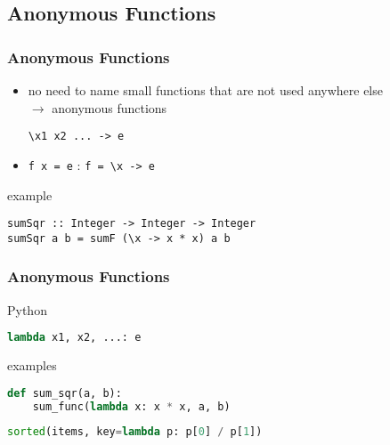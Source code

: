 \documentclass[dvipsnames]{beamer}
\theoremstyle{plain}
\begin{document}
\subsection{Anonymous Functions}

\begin{frame}[fragile]
  \frametitle{Anonymous Functions}

  \begin{itemize}
    \item no need to name small functions that are not used anywhere else\\
      $\rightarrow$ \alert{anonymous} functions
    \begin{lstlisting}[style=syntax]
\x1 x2 ... -> e
    \end{lstlisting}
    \item \lstinline|f x = e| \hspace{36pt} : \hspace{36pt} \lstinline|f = \x -> e|
  \end{itemize}

  \pause
  \medskip
  \begin{exampleblock}{example}
    \begin{lstlisting}
sumSqr :: Integer -> Integer -> Integer
sumSqr a b = sumF (\x -> x * x) a b
    \end{lstlisting}
  \end{exampleblock}
\end{frame}

\begin{frame}[fragile]
  \frametitle{Anonymous Functions}

  \begin{block}{Python}
    \begin{lstlisting}[language=Python, style=syntax]
lambda x1, x2, ...: e
    \end{lstlisting}
  \end{block}

  \medskip
  \begin{exampleblock}{examples}
    \begin{lstlisting}[language=Python]
def sum_sqr(a, b):
    sum_func(lambda x: x * x, a, b)
    \end{lstlisting}

    \pause
    \bigskip
    \begin{lstlisting}[language=Python]
sorted(items, key=lambda p: p[0] / p[1])
    \end{lstlisting}
  \end{exampleblock}
\end{frame}
\end{document}
